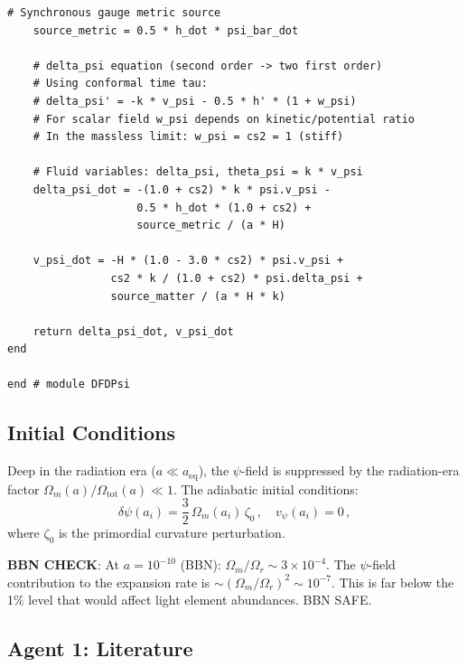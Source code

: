 \documentclass[11pt,a4paper]{article}
\begin{document}
\begin{lstlisting}[caption={DFDPsi.jl --- Dynamical psi-field species for Bolt.jl},label=lst:dfdpsi]
    # Synchronous gauge metric source
    source_metric = 0.5 * h_dot * psi_bar_dot

    # delta_psi equation (second order -> two first order)
    # Using conformal time tau:
    # delta_psi' = -k * v_psi - 0.5 * h' * (1 + w_psi)
    # For scalar field w_psi depends on kinetic/potential ratio
    # In the massless limit: w_psi = cs2 = 1 (stiff)

    # Fluid variables: delta_psi, theta_psi = k * v_psi
    delta_psi_dot = -(1.0 + cs2) * k * psi.v_psi -
                    0.5 * h_dot * (1.0 + cs2) +
                    source_metric / (a * H)

    v_psi_dot = -H * (1.0 - 3.0 * cs2) * psi.v_psi +
                cs2 * k / (1.0 + cs2) * psi.delta_psi +
                source_matter / (a * H * k)

    return delta_psi_dot, v_psi_dot
end

end # module DFDPsi
\end{lstlisting}

\subsection{Initial Conditions}

Deep in the radiation era ($a \ll a_{\mathrm{eq}}$), the $\psi$-field is suppressed by the radiation-era factor $\Omega_m(a)/\Omega_{\mathrm{tot}}(a) \ll 1$. The adiabatic initial conditions:
\begin{equation}
\delta\psi(a_i) = \frac{3}{2}\,\Omega_m(a_i)\,\zeta_0\,,\quad v_\psi(a_i) = 0\,,
\end{equation}
where $\zeta_0$ is the primordial curvature perturbation.

\textbf{BBN CHECK}: At $a = 10^{-10}$ (BBN): $\Omega_m / \Omega_r \sim 3 \times 10^{-4}$. The $\psi$-field contribution to the expansion rate is $\sim (\Omega_m/\Omega_r)^2 \sim 10^{-7}$. This is far below the 1\% level that would affect light element abundances. BBN SAFE.

\subsection{Agent 1: Literature}
\end{document}
